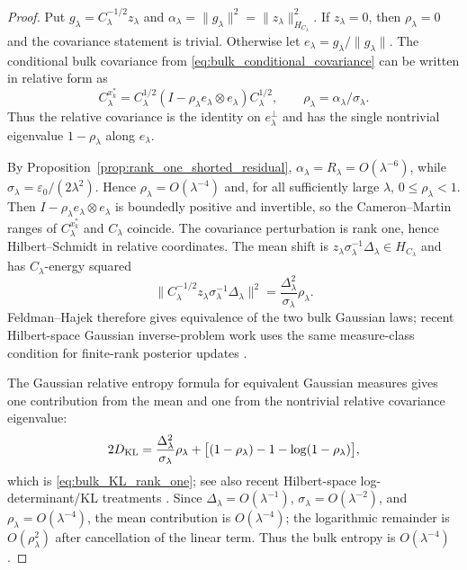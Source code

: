 \begin{proof}
Put $g_\lambda=C_\lambda^{-1/2}z_\lambda$ and
$\alpha_\lambda=\|g_\lambda\|^2=\|z_\lambda\|_{H_{C_\lambda}}^2$.  If
$z_\lambda=0$, then $\rho_\lambda=0$ and the covariance statement is trivial.
Otherwise let $e_\lambda=g_\lambda/\|g_\lambda\|$.  The conditional bulk
covariance from \eqref{eq:bulk_conditional_covariance} can be written in
relative form as
\begin{equation}
  C_\lambda^{x_k^*}
  =C_\lambda^{1/2}
    (I-\rho_\lambda e_\lambda\otimes e_\lambda)
    C_\lambda^{1/2},
  \qquad
  \rho_\lambda=\alpha_\lambda/\sigma_\lambda.
  \label{eq:relative_rank_one_covariance}
\end{equation}
Thus the relative covariance is the identity on
$e_\lambda^\perp$ and has the single nontrivial eigenvalue
$1-\rho_\lambda$ along $e_\lambda$.

By Proposition~\ref{prop:rank_one_shorted_residual},
$\alpha_\lambda=R_\lambda=O(\lambda^{-6})$, while
$\sigma_\lambda=\varepsilon_0/(2\lambda^2)$.  Hence
$\rho_\lambda=O(\lambda^{-4})$ and, for all sufficiently large $\lambda$,
$0\le\rho_\lambda<1$.  Then
$I-\rho_\lambda e_\lambda\otimes e_\lambda$ is boundedly positive and invertible,
so the Cameron--Martin ranges of $C_\lambda^{x_k^*}$ and $C_\lambda$ coincide.
The covariance perturbation is rank one, hence Hilbert--Schmidt in relative
coordinates.  The mean shift is
$z_\lambda\sigma_\lambda^{-1}\Delta_\lambda\in H_{C_\lambda}$ and has
$C_\lambda$-energy squared
\[
  \bigl\|C_\lambda^{-1/2}z_\lambda\sigma_\lambda^{-1}\Delta_\lambda\bigr\|^2
  =\frac{\Delta_\lambda^2}{\sigma_\lambda}\rho_\lambda.
\]
Feldman--Hajek therefore gives equivalence of the two bulk Gaussian laws; recent Hilbert-space Gaussian inverse-problem work uses the same measure-class condition for finite-rank posterior updates \cite{carerelie2024covariance,carerelie2025mean}.

The Gaussian relative entropy formula for equivalent Gaussian measures gives
one contribution from the mean and one from the nontrivial relative covariance
eigenvalue:
\[
  2D_{\operatorname{KL}}
  =
  \frac{\Delta_\lambda^2}{\sigma_\lambda}\rho_\lambda
  +\bigl[(1-\rho_\lambda)-1-\log(1-\rho_\lambda)\bigr],
\]
which is \eqref{eq:bulk_KL_rank_one}; see also recent Hilbert-space log-determinant/KL treatments \cite{quang2022kl,carerelie2024covariance}.  Since
$\Delta_\lambda=O(\lambda^{-1})$, $\sigma_\lambda=O(\lambda^{-2})$, and
$\rho_\lambda=O(\lambda^{-4})$, the mean contribution is $O(\lambda^{-4})$;
the logarithmic remainder is $O(\rho_\lambda^2)$ after cancellation of the
linear term.  Thus the bulk entropy is $O(\lambda^{-4})$.
\end{proof}

